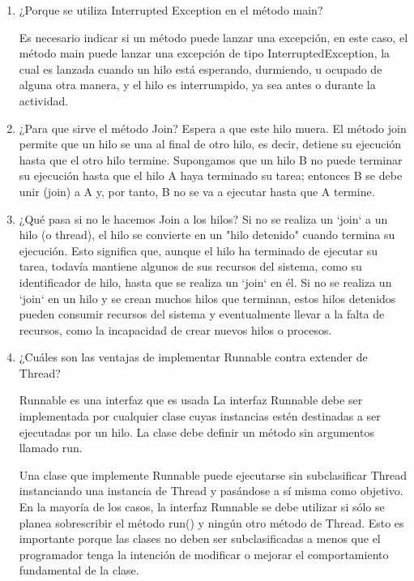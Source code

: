 \documentclass{article}
\begin{document}
\begin{enumerate}
    \item ¿Porque se utiliza Interrupted Exception en el método main?
    
    Es necesario indicar si un método puede lanzar una excepción, en este caso, el método main puede lanzar una excepción de tipo InterruptedException, la cual es lanzada cuando un hilo está esperando, durmiendo, u ocupado de alguna otra manera, y el hilo es interrumpido, ya sea antes o durante la actividad. 

    \item ¿Para que sirve el método Join?
    Espera a que este hilo muera. 
    El método join permite que un hilo se una al final de otro hilo, es decir, detiene su ejecución hasta que el otro hilo termine.
    Supongamos que un hilo B no puede terminar su ejecución hasta que el hilo A haya terminado su tarea; entonces B se debe unir (join) a A y, por tanto, B no se va a ejecutar hasta que A termine.
    
    \item ¿Qué pasa si no le hacemos Join a los hilos?
    Si no se realiza un `join` a un hilo (o thread), el hilo se convierte en un "hilo detenido" cuando termina su ejecución. Esto significa que, aunque el hilo ha terminado de ejecutar su tarea, todavía mantiene algunos de sus recursos del sistema, como su identificador de hilo, hasta que se realiza un `join` en él. Si no se realiza un `join` en un hilo y se crean muchos hilos que terminan, estos hilos detenidos pueden consumir recursos del sistema y eventualmente llevar a la falta de recursos, como la incapacidad de crear nuevos hilos o procesos.

    \item ¿Cuáles son las ventajas de implementar Runnable contra extender de Thread?
    
    Runnable es una interfaz que es usada
    La interfaz Runnable debe ser implementada por cualquier clase cuyas instancias estén destinadas a ser ejecutadas por un hilo. La clase debe definir un método sin argumentos llamado run.
    
    Una clase que implemente Runnable puede ejecutarse sin subclasificar Thread instanciando una instancia de Thread y pasándose a sí misma como objetivo. En la mayoría de los casos, la interfaz Runnable se debe utilizar si sólo se planea sobrescribir el método run() y ningún otro método de Thread. Esto es importante porque las clases no deben ser subclasificadas a menos que el programador tenga la intención de modificar o mejorar el comportamiento fundamental de la clase.


\end{enumerate}
\end{document}
